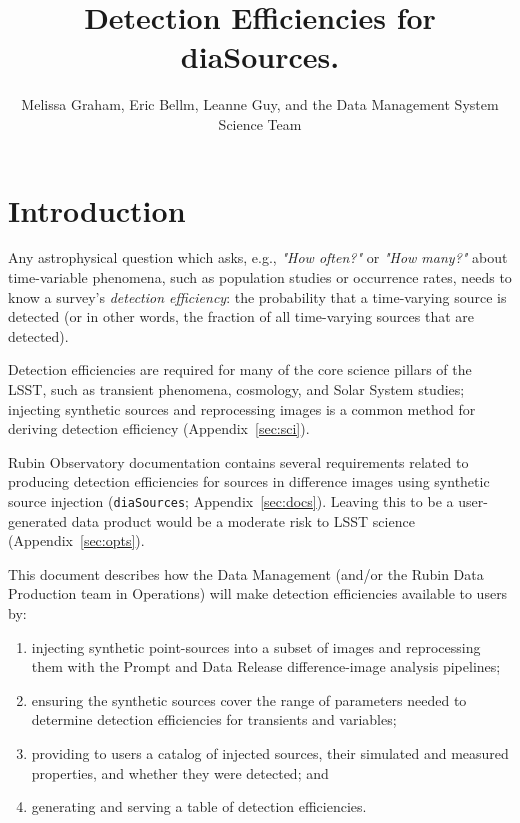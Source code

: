 \documentclass[DM,authoryear,toc]{lsstdoc}
\title{Detection Efficiencies for diaSources.}
\author{%
Melissa Graham, 
Eric Bellm,
Leanne Guy,
and the Data Management System Science Team
}
\date{\vcsDate}
\begin{document}
\maketitle


\section{Introduction} \label{sec:intro}

Any astrophysical question which asks, e.g., {\it "How often?"} or {\it "How many?"} about time-variable phenomena, such as population studies or occurrence rates, needs to know a survey's {\it detection efficiency}: the probability that a time-varying source is detected (or in other words, the fraction of all time-varying sources that are detected).

Detection efficiencies are required for many of the core science pillars of the LSST, such as transient phenomena, cosmology, and Solar System studies; injecting synthetic sources and reprocessing images is a common method for deriving detection efficiency (Appendix~\ref{sec:sci}).

Rubin Observatory documentation contains several requirements related to producing detection efficiencies for sources in difference images using synthetic source injection ({\tt diaSources}; Appendix~\ref{sec:docs}).
Leaving this to be a user-generated data product would be a moderate risk to LSST science (Appendix~\ref{sec:opts}).

This document describes how the Data Management (and/or the Rubin Data Production team in Operations) will make detection efficiencies available to users by:

\begin{enumerate}
\item injecting synthetic point-sources into a subset of images and reprocessing them with the Prompt and Data Release difference-image analysis pipelines;
\item ensuring the synthetic sources cover the range of parameters needed to determine detection efficiencies for transients and variables;
\item providing to users a catalog of injected sources, their simulated and measured properties, and whether they were detected; and
\item generating and serving a table of detection efficiencies.
\end{enumerate}
\end{document}
